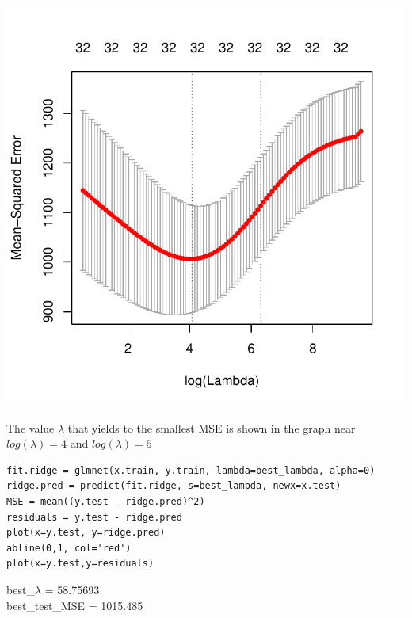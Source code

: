 \documentclass[]{report}
\begin{document}
\begin{center}
	\includegraphics{Figures/cv_glmnet.pdf}
\end{center}

The value $\lambda$ that yields to the smallest MSE is shown in the graph near $log(\lambda)=4$ and $log(\lambda)=5 $


\begin{lstlisting}
fit.ridge = glmnet(x.train, y.train, lambda=best_lambda, alpha=0)
ridge.pred = predict(fit.ridge, s=best_lambda, newx=x.test)
MSE = mean((y.test - ridge.pred)^2)
residuals = y.test - ridge.pred
plot(x=y.test, y=ridge.pred)
abline(0,1, col='red')
plot(x=y.test,y=residuals)
\end{lstlisting}

\begin{center} 
	best\_$\lambda$ = 58.75693 \\
	best\_test\_MSE = 1015.485
\end{center} 
\end{document}
